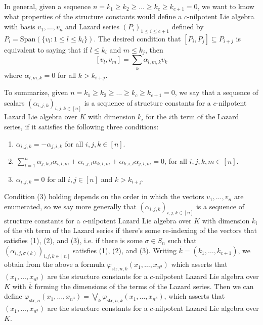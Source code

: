 \documentclass[psamsfonts]{amsart}
\theoremstyle{definition}
\theoremstyle{definition}
\theoremstyle{remark}
\numberwithin{equation}{section}
\begin{document}
In general, given a sequence $n = k_{1} \geq k_{2} \geq \ldots \geq k_{c} \geq k_{c+1} = 0$, we want to know what properties of the structure constants would define a $c$-nilpotent Lie algebra with basis $v_{1}, \ldots, v_{n}$ and Lazard series $(P_{i})_{1 \leq i \leq c+1}$ defined by $P_{i} = \mathrm{Span}(\{v_{l} : 1 \leq l \leq k_{i}\})$.  The desired condition that $[P_{i},P_{j}] \subseteq P_{i+j}$ is equivalent to saying that if $l \leq k_{i}$ and $m \leq k_{j}$, then 
$$
[v_{l},v_{m}] = \sum_{k} \alpha_{l,m,k} v_{k}
$$
where $\alpha_{l,m,k} = 0$ for all $k > k_{i+j}$.  

To summarize, given $n = k_{1} \geq k_{2} \geq \ldots \geq k_{c} \geq k_{c+1} = 0$, we say that a sequence of scalars $(\alpha_{i,j,k})_{i,j,k \in [n]}$ is a sequence of structure constants for a $c$-nilpotent Lazard Lie algebra over $K$ with dimension $k_{i}$ for the $i$th term of the Lazard series, if it satisfies the following three conditions:
\begin{enumerate}
\item $\alpha_{i,j,k} = - \alpha_{j,i,k}$ for all $i,j,k \in [n]$.
\item $\sum_{l = 1}^{n} \alpha_{j,k,l}\alpha_{i,l,m} + \alpha_{i,j,l} \alpha_{k,l,m} + \alpha_{k,i,l} \alpha_{j,l,m} = 0$, for all $i,j,k,m \in [n]$.
\item $\alpha_{i,j,k} = 0$ for all $i,j \in [n]$ and $k > k_{i+j}$.
\end{enumerate}
Condition (3) holding depends on the order in which the vectors $v_{1}, \ldots, v_{n}$ are enumerated, so we say more generally that $(\alpha_{i,j,k})_{i,j,k \in [n]}$ is a sequence of structure constants for a $c$-nilpotent Lazard Lie algebra over $K$ with dimension $k_{i}$ of the $i$th term of the Lazard series if there's some re-indexing of the vectors that satisfies (1), (2), and (3), i.e. if there is some $\sigma \in S_{n}$ such that $(\alpha_{i,j,\sigma(k)})_{i,j,k \in [n]}$ satisfies (1), (2), and (3).  Writing $\overline{k} = (k_{1}, \ldots, k_{c+1})$, we obtain from the above a formula $\varphi_{\mathrm{str},n,\overline{k}}(x_{1}, \ldots, x_{n^{3}})$ which asserts that $(x_{1}, \ldots, x_{n^{3}})$ are the structure constants for a $c$-nilpotent Lazard Lie algebra over $K$ with $\overline{k}$ forming the dimensions of the terms of the Lazard series.  Then we can define $\varphi_{\mathrm{str},n}(x_{1},\ldots, x_{n^3}) = \bigvee_{\overline{k}} \varphi_{\mathrm{str},n,\overline{k}}(x_{1}, \ldots, x_{n^3})$, which   asserts that $(x_{1}, \ldots, x_{n^{3}})$ are the structure constants for a $c$-nilpotent Lazard Lie algebra over $K$.
\end{document}
